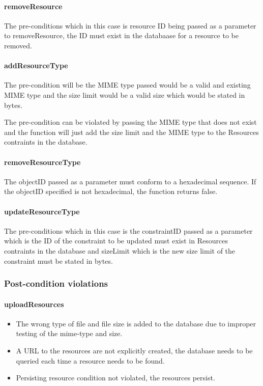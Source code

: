 \documentclass[a4paper]{article}
\begin{document}
\paragraph{removeResource}
The pre-conditions which in this case is resource ID being passed as a parameter to removeResource, the ID must exist in the databaase for a resource to be removed.

\paragraph{addResourceType}
The pre-condition will be the MIME type passed would be a valid and existing MIME type and the size limit would be a valid size which would be stated in bytes.

The pre-condition can be violated by passing the MIME type that does not exist and the function will just add the size limit and the MIME type to the Resources contraints in the database.

\paragraph{removeResourceType}
The objectID passed as a parameter must conform to a hexadecimal sequence. If the objectID specified is not hexadecimal, the function returns false.

\paragraph{updateResourceType}
The pre-conditions which in this case is the constraintID passed as a parameter which is the ID of the constraint to be updated must exist in Resources contraints in the database and sizeLimit which is the new size limit of the constraint must be stated in bytes.

\subsubsection {Post-condition violations}

\paragraph{uploadResources}
\begin{itemize}
\item The wrong type of file and file size is added to the database due to improper testing of the mime-type and size.
\item A URL to the resources are not explicitly created, the database needs to be queried each time a resource needs to be found.
\item Persisting resource condition not violated, the resources persist.
\end{itemize}
\end{document}
